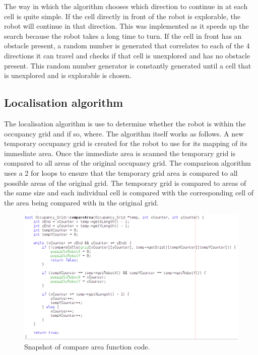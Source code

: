\documentclass[a4paper,12pt]{article}
\begin{document}
\vspace{5mm}
\noindent The way in which the algorithm chooses which direction to continue in at each cell is quite simple. If the cell directly in front of the robot is explorable, the robot will continue in that direction. This was implemented as it speeds up the search because the robot takes a long time to turn. If the cell in front has an obstacle present, a random number is generated that correlates to each of the 4 directions it can travel and checks if that cell is unexplored and has no obstacle present. This random number generator is constantly generated until a cell that is unexplored and is explorable is chosen.

\subsection{Localisation algorithm}
\noindent The localisation algorithm is use to determine whether the robot is within the occupancy grid and if so, where. The algorithm itself works as follows. A new temporary occupancy grid is created for the robot to use for its mapping of its immediate area. Once the immediate area is scanned the temporary grid is compared to all areas of the original occupancy grid. The comparison algorithm uses a 2 for loops to ensure that the temporary grid area is compared to all possible areas of the original grid. The temporary grid is compared to areas of the same size and each individual cell is compared with the corresponding cell of the area being compared with in the original grid.

\begin{figure}[H]
\includegraphics[scale=0.65]{Compare_Area_SS.png}
\caption{Snapshot of compare area function code.}
\end{figure}
\end{document}
